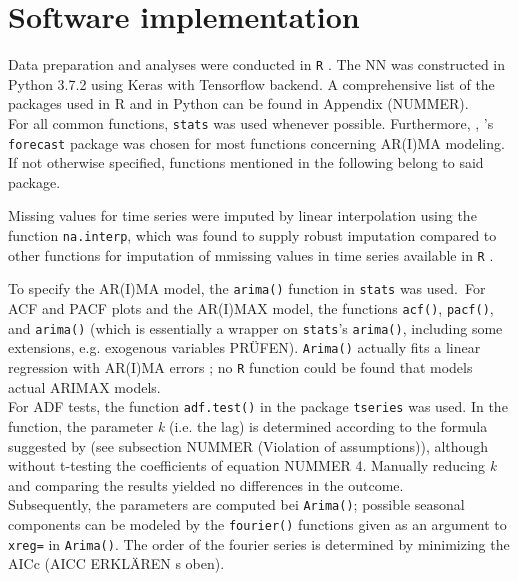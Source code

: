 \documentclass[a4paper, 11pt]{article}
\begin{document}
\section{Software implementation}

Data preparation and analyses were conducted in \texttt{R} \citep{Team.2013}. The NN was constructed in Python 3.7.2 using Keras \citep{chollet2015keras} with Tensorflow \citep{tensorflow2015-whitepaper} backend. A comprehensive list of the packages used in R and in Python can be found in Appendix (NUMMER).\\

For all common functions, \texttt{stats} was used whenever possible. Furthermore, , \cite{Hyndman.2008}'s  \texttt{forecast} package was chosen for most functions concerning AR(I)MA modeling. If not otherwise specified, functions mentioned in the following belong to said package.

Missing values for time series were imputed by linear interpolation using the function \texttt{na.interp}, which was found to supply robust imputation compared to other functions for imputation of mmissing values in time series available in \texttt{R} \citep{Moritz2015ComparisonOD}. 

To specify the AR(I)MA model, the \texttt{arima()} function in \texttt{stats{}} was used.\
For ACF and PACF plots and the AR(I)MAX model, the functions \texttt{acf()}, \texttt{pacf()}, and \texttt{arima()} (which is essentially a wrapper on \texttt{stats}'s \texttt{arima()}, including some extensions, e.g. exogenous variables PRÜFEN). \texttt{Arima()} actually fits a linear regression with AR(I)MA errors \citep{Hyndman.2018}; no \texttt{R} function could be found that models actual ARIMAX models.\\
For ADF tests, the function \texttt {adf.test()} in the package \texttt{tseries} was used. In the function, the parameter \textit{k} (i.e. the lag) is determined according to the formula suggested by \cite{Vogel.2015} (see subsection NUMMER (Violation of assumptions)), although without t-testing the coefficients of equation NUMMER 4. Manually reducing \textit{k} and comparing the results yielded no differences in the outcome.\\

Subsequently, the parameters are computed bei \texttt{Arima()}; possible seasonal components can be modeled by the \texttt{fourier()} functions given as an argument to \texttt{xreg=} in \texttt{Arima()}. The order of the fourier series is determined by minimizing the AICc (AICC ERKLÄREN s oben). \
\end{document}
